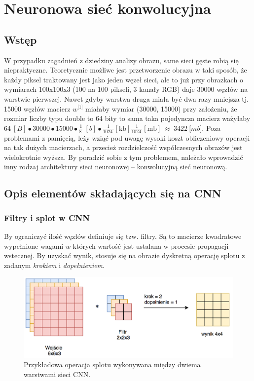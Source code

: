 \chapter{Neuronowa sieć konwolucyjna}
\label{chap:cnn}

\section{Wstęp}
\label{cnn-wstęp}
W przypadku zagadnień z dziedziny analizy obrazu, same sieci gęste robią się niepraktyczne. Teoretycznie możliwe jest przetworzenie obrazu w taki sposób, że każdy piksel traktowany jest jako jeden węzeł sieci, ale to już przy obrazkach o wymiarach 100x100x3 (100 na 100 pikseli, 3 kanały RGB) daje 30000 węzłów na warstwie pierwszej. Nawet gdyby warstwa druga
miała być dwa razy mniejsza tj. 15000 węzłów macierz \(w^{\lbrack 1\rbrack}\) miałaby wymiar (30000, 15000) przy założeniu, że rozmiar liczby typu double to 64 bity to sama taka pojedyncza macierz ważyłaby \(64\ \left\lbrack B \right\rbrack \bullet 30000 \bullet 15000 \bullet \frac{1}{8\ }\ \left\lbrack b \right\rbrack \bullet \frac{1}{1024\ }\left\lbrack \text{kb} \right\rbrack\frac{1}{1024\ }\left\lbrack \text{mb} \right\rbrack\  \approx \ 3422\ \lbrack mb\rbrack\). Poza problemami z pamięcią,
leży wziąć pod uwagę wysoki koszt obliczeniowy operacji na tak dużych macierzach, a przecież rozdzielczość współczesnych obrazów jest wielokrotnie wyższa. By poradzić sobie z tym problemem, należało wprowadzić inny rodzaj architektury sieci neuronowej -- konwolucyjną sieć neuronową.

\section{Opis elementów składających się na CNN}
\label{opis-elementów-cnn}

\subsection{Filtry i splot w CNN}

By ograniczyć ilość węzłów definiuje się tzw. filtry. Są to macierze kwadratowe wypełnione wagami \(w\) których wartość jest ustalana w procesie propagacji wstecznej. By uzyskać wynik, stosuje się na obrazie dyskretną operację splotu z zadanym \emph{krokiem} i \emph{dopełnieniem}.

\begin{figure}[ht]
\centerline{\includegraphics[scale=1]{resources/splot.png}}
\caption{Przykładowa operacja splotu wykonywana między dwiema warstwami sieci CNN.}
\label{fig:splot}
\end{figure}

